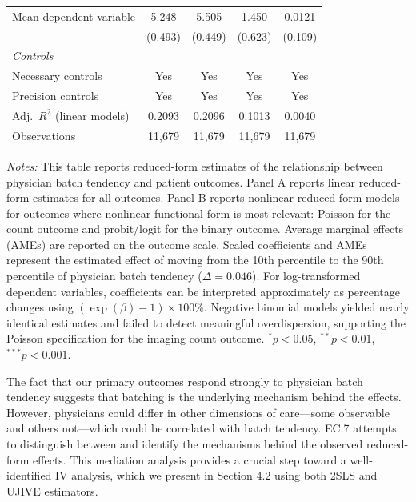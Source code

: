 \documentclass[,,blindrev]{informs}
\begin{document}
\begin{table}[t!]
\begin{threeparttable}
\begin{tabular}{p{5.2cm}cccc}
Mean dependent variable
& 5.248 & 5.505 & 1.450 & 0.0121 \\
& (0.493) & (0.449) & (0.623) & (0.109) \\

\midrule
\textit{Controls} \\
Necessary controls & Yes & Yes & Yes & Yes \\
Precision controls & Yes & Yes & Yes & Yes \\

\midrule
Adj.\ $R^2$ (linear models)
& 0.2093 & 0.2096 & 0.1013 & 0.0040 \\

Observations
& 11{,}679 & 11{,}679 & 11{,}679 & 11{,}679 \\
\bottomrule
\end{tabular}

\begin{flushleft}
\footnotesize
\textit{Notes:}
This table reports reduced-form estimates of the relationship between physician batch tendency and patient outcomes. Panel A reports linear reduced-form estimates for all outcomes. Panel B reports nonlinear reduced-form models for outcomes where nonlinear functional form is most relevant: Poisson for the count outcome and probit/logit for the binary outcome. Average marginal effects (AMEs) are reported on the outcome scale. Scaled coefficients and AMEs represent the estimated effect of moving from the 10th percentile to the 90th percentile of physician batch tendency ($\Delta = 0.046$). For log-transformed dependent variables, coefficients can be interpreted approximately as percentage changes using $(\exp(\beta)-1)\times100\%$. Negative binomial models yielded nearly identical estimates and failed to detect meaningful overdispersion, supporting the Poisson specification for the imaging count outcome.
$^{*} p < 0.05$,
$^{**} p < 0.01$,
$^{***} p < 0.001$.
\end{flushleft}

\end{threeparttable}
\end{table}

The fact that our primary outcomes respond strongly to physician batch
tendency suggests that batching is the underlying mechanism behind the
effects. However, physicians could differ in other dimensions of
care---some observable and others not---which could be correlated with
batch tendency. EC.7 attempts to distinguish between and identify the
mechanisms behind the observed reduced-form effects. This mediation
analysis provides a crucial step toward a well-identified IV analysis,
which we present in Section 4.2 using both 2SLS and UJIVE estimators.
\end{document}
